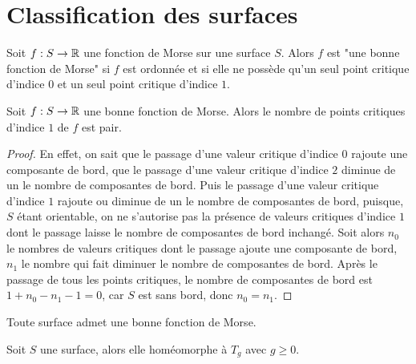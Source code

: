 \section{Classification des surfaces}

\begin{defi}
    Soit $f:S\to \operatorname{\mathbb R}$ une fonction de Morse sur une surface $S$. 
    Alors $f$ est "une bonne fonction de Morse" si $f$ est ordonnée et 
    si elle ne possède qu'un seul point critique d'indice $0$ et un seul 
    point critique d'indice $1$.
\end{defi}

\begin{prop}
    Soit $f:S\to\operatorname{\mathbb R}$ une bonne fonction de Morse. Alors le nombre de points 
    critiques d'indice $1$ de $f$ est pair.
\end{prop}

\begin{proof}
    En effet, on sait que le passage d'une valeur critique d'indice $0$ rajoute
    une composante de bord, que le passage d'une valeur critique d'indice $2$ diminue 
    de un le nombre de composantes de bord. 
    Puis le passage d'une valeur critique d'indice $1$ rajoute ou diminue de un le nombre 
    de composantes de bord, puisque, $S$ étant orientable, on ne s'autorise pas la présence 
    de valeurs critiques d'indice $1$ dont le passage laisse le nombre de composantes de bord 
    inchangé. 
    Soit alors $n_0$ le nombres de valeurs critiques dont le passage ajoute une composante de 
    bord, $n_1$ le nombre qui fait diminuer le nombre de composantes de bord. 
    Après le passage de tous les points critiques, le nombre de composantes de bord est 
    $1+n_0-n_1-1=0$, car $S$ est sans bord, donc $n_0=n_1$.
\end{proof}

\begin{thm}
    Toute surface admet une bonne fonction de Morse.
\end{thm}

\begin{thm}
    Soit $S$ une surface, alors elle homéomorphe à $T_g$ avec $g\geq 0$.
\end{thm}


